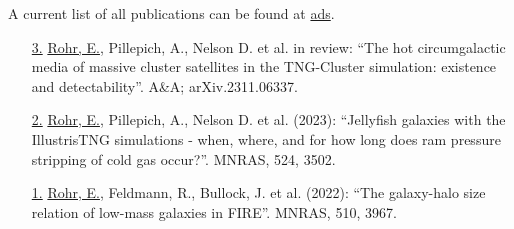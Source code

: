 \documentclass[a4paper,10pt,oneside]{article}
\begin{document}
\noindent{}

\vspace{5.5pt}

\noindent A current list of all publications can be found at \href{https://ui.adsabs.harvard.edu/search/q=%20%20author%3A%22rohr%2C%20eric%22%2C%20year%3A2019-2030&sort=date%20desc%2C%20bibcode%20desc&p_=0}{ads}. 

\vspace{5.5pt} 

\begin{enumerate}[wide, labelwidth=!, labelindent=-11pt, parsep=0pt]
    \item[\href{https://ui.adsabs.harvard.edu/abs/2023arXiv231106337R/abstract}{3.}] \underline{Rohr, E.}, Pillepich, A., Nelson D. et al. in review: ``The hot circumgalactic media of massive cluster satellites in the TNG-Cluster simulation: existence and detectability''. A\&A; arXiv.2311.06337.
    \item[\href{https://ui.adsabs.harvard.edu/abs/2023MNRAS.524.3502R/abstract}{2.}] \underline{Rohr, E.}, Pillepich, A., Nelson D. et al. (2023): ``Jellyfish galaxies with the IllustrisTNG simulations - when, where, and for how long does ram pressure stripping of cold gas occur?''. MNRAS, 524, 3502.
    \item[\href{https://ui.adsabs.harvard.edu/abs/2022MNRAS.510.3967R/abstract}{1.}] \underline{Rohr, E.}, Feldmann, R., Bullock, J. et al. (2022): ``The galaxy-halo size relation of low-mass galaxies in FIRE''. MNRAS, 510, 3967.
\end{enumerate}
\end{document}
